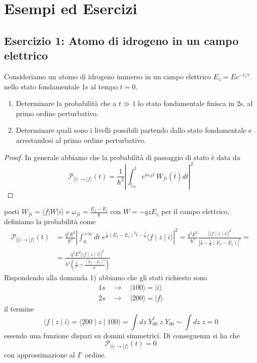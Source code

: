 \newpage

\section{Esempi ed Esercizi}

\subsection{Esercizio 1: Atomo di idrogeno in un campo elettrico}

Consideriamo un atomo di idrogeno immerso in un campo elettrico $E_z = E e^{-t/\tau}$ nello stato fondamentale 1s al tempo $t=0$.
\begin{enumerate}
	\item Determinare la probabilit\`a che a $t \gg 1$ lo stato fondamentale finisca in 2s, al primo ordine perturbativo.
	\item Determinare quali sono i livelli possibili partendo dallo stato fondamentale e arrestandosi al primo ordine perturbativo.
\end{enumerate}

\begin{proof}
	In generale abbiamo che la probabilit\`a di passaggio di stato \`e data da
	\begin{equation*}
		\mathcal{P}_{|i\rangle \to |f \rangle}(t)  = \frac{1}{\hbar^2} \left| \int_{t_{in}}^{t}e^{i\omega_{fi}\overline{t}}\,W_{fi}(\overline{t})d\overline{t}\right|^2   
	\end{equation*}
\end{proof}
posti $W_{fi} =\langle f | W|i\rangle$ e $\omega_{fi} = \frac{E_{f}-E_{i}}{\hbar}$ con $W = -qzE_z$ per il campo elettrico, definiamo la probabilit\`a come 
\begin{align*}
	\mathcal{P}_{|i\rangle \to |f \rangle}(t) &= \frac{q^2E^2}{\hbar^2} \left | \int_{0}^{+\infty} d\overline{t} \; e^{\frac{i}{\hbar}(E_f-E_i)^2 \overline{t}-\frac{\overline{t}}{\tau}}\langle f \mid z\mid i \rangle \right|^2 = \frac{q^2E^2}{\hbar^2}\frac{|\langle f \mid z\mid i \rangle|^2}{|\frac{1}{\tau} - \frac{i}{\hbar}(E_f-E_i)|^2} = \\[0.5cm]
	& =  \frac{q^2E^2|\langle f \mid z\mid i \rangle|^2}{\hbar^2(\frac{1}{\tau^2} + \frac{(E_f-E_i)^2}{\hbar^2})}
\end{align*}
Rispondendo alla domanda 1) abbiamo che gli stati richiesto sono
\begin{align*}
	1s \quad \to \quad |100\rangle = |i\rangle \\[0.3cm]
	2s \quad \to \quad |200\rangle = |f \rangle 
\end{align*}
il termine 
\begin{equation*}
	\langle f \mid z \mid i\rangle = \langle 200  \mid z \mid 100 \rangle = \int dz \; Y_{00} ^*\;z\;Y_{00} \sim \int dz\; z = 0
\end{equation*}
essendo una funzione dispari su domini simmetrici. Di conseguenza si ha che 
\begin{equation*}
	\mathcal{P}_{|i\rangle \to |f \rangle}(t) = 0
\end{equation*}
con approssimazione al $I^\circ $ ordine.
\newline

